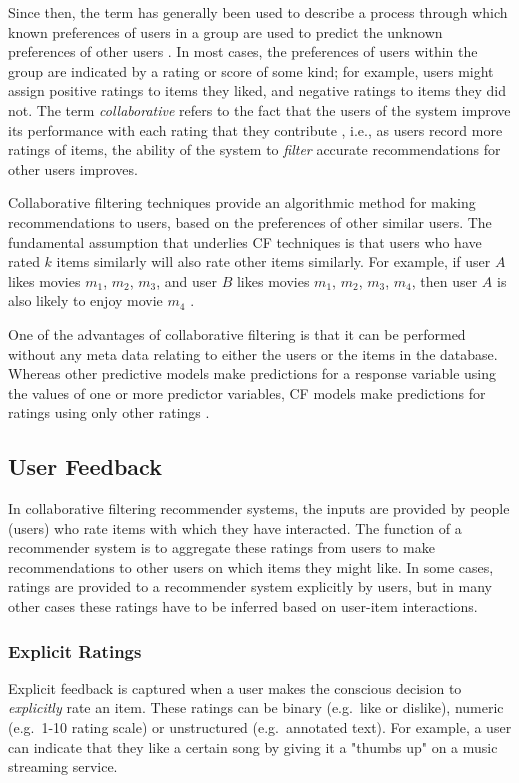 Since then, the term has generally been used to describe a process through which known preferences of users in a group are used to predict the unknown preferences of other users \parencite{cf_1.1}. In most cases, the preferences of users within the group are indicated by a rating or score of some kind; for example, users might assign positive ratings to items they liked, and negative ratings to items they did not. The term \textit{collaborative} refers to the fact that the users of the system improve its performance with each rating that they contribute \parencite{cf_1.2_eigentaste}, i.e., as users record more ratings of items, the ability of the system to \textit{filter} accurate recommendations for other users improves. 

Collaborative filtering techniques provide an algorithmic method for making recommendations to users, based on the preferences of other similar users. The fundamental assumption that underlies CF techniques is that users who have rated $k$ items similarly will also rate other items similarly. For example, if user $A$ likes movies $m_1$, $m_2$, $m_3$, and user $B$ likes movies $m_1$, $m_2$, $m_3$, $m_4$, then user $A$ is also likely to enjoy movie $m_4$ \parencite{cf_1.1}.

One of the advantages of collaborative filtering is that it can be performed without any meta data relating to either the users or the items in the database. Whereas other predictive models make predictions for a response variable using the values of one or more predictor variables, CF models make predictions for ratings using only other ratings \parencite{handbook_1.1_intro}.

\subsection{User Feedback}
 In collaborative filtering recommender systems, the inputs are provided by people (users) who rate items with which they have interacted. The function of a recommender system is to aggregate these ratings from users to make recommendations to other users on which items they might like. In some cases, ratings are provided to a recommender system explicitly by users, but in many other cases these ratings have to be inferred based on user-item interactions. 

\subsubsection{Explicit Ratings}
Explicit feedback is captured when a user makes the conscious decision to \textit{explicitly} rate an item. These ratings can be binary (e.g.\ like or dislike), numeric (e.g.\ 1-10 rating scale) or unstructured (e.g.\ annotated text). For example, a user can indicate that they like a certain song by giving it a "thumbs up" on a music streaming service.

